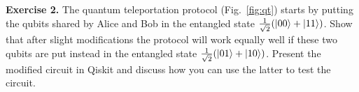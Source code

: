 \documentclass[a4paper, 11pt]{article}
\theoremstyle{definition}
\begin{document}
\noindent
\textbf{Exercise 2.} The quantum teleportation protocol
(Fig.~\ref{fig:qt}) starts by putting the qubits shared by Alice and
Bob in the entangled state $\frac{1}{\sqrt{2}}(\ket{00} + \ket{11})$.
Show that after slight modifications the protocol will work equally
well if these two qubits are put instead in the entangled state
$\frac{1}{\sqrt{2}}(\ket{01} + \ket{10})$. Present the modified
circuit in Qiskit and discuss how you can use the latter to test the
circuit.



\end{document}
